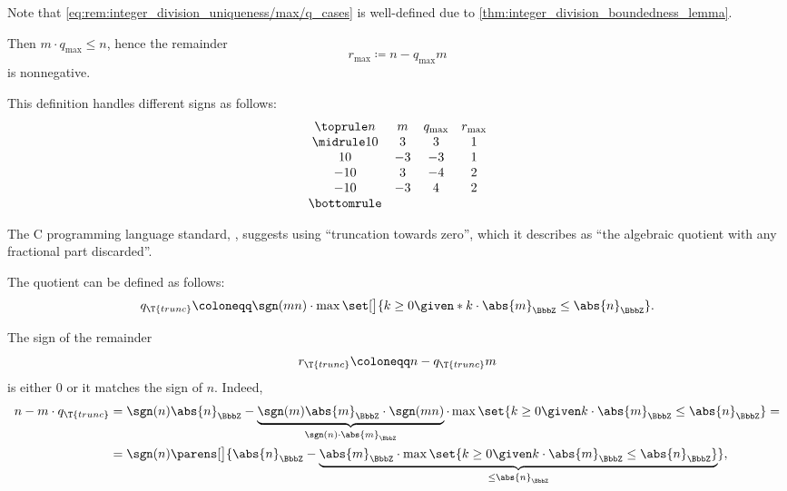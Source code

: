 \begin{remark}
\begin{thmenum}
    Note that \eqref{eq:rem:integer_division_uniqueness/max/q_cases} is well-defined due to \cref{thm:integer_division_boundedness_lemma}.

    Then \( m \cdot q_{\max} \leq n \), hence the remainder
    \begin{equation*}
      r_{\max} \coloneqq n - q_{\max} m
    \end{equation*}
    is nonnegative.

    This definition handles different signs as follows:
    \begin{equation*}
      \begin{array}{*{4}{c}}
        \toprule
        n   & m  & q_{\max} & r_{\max} \\
        \midrule
        10  & 3  & 3        & 1        \\
        10  & -3 & -3       & 1        \\
        -10 & 3  & -4       & 2        \\
        -10 & -3 & 4        & 2        \\
        \bottomrule
      \end{array}
    \end{equation*}

     The C programming language standard, \cite[66]{ISO:9899:2018}, suggests using \enquote{truncation towards zero}, which it describes as \enquote{the algebraic quotient with any fractional part discarded}.

    The quotient can be defined as follows:
    \begin{equation}\label{eq:rem:integer_division_uniqueness/trunc/q}
      q_{\T{trunc}} \coloneqq \sgn(mn) \cdot \max\set[\big]{ k \geq 0 \given* k \cdot \abs{m}_\BbbZ \leq \abs{n}_\BbbZ }.
    \end{equation}

    The sign of the remainder
    \begin{equation*}
      r_{\T{trunc}} \coloneqq n - q_{\T{trunc}} m
    \end{equation*}
    is either \( 0 \) or it matches the sign of \( n \). Indeed,
    \begin{align*}
      n - m \cdot q_{\T{trunc}}
      &=
      \sgn(n) \abs{n}_\BbbZ - \underbrace{\sgn(m) \abs{m}_\BbbZ \cdot \sgn(mn)}_{\sgn(n) \cdot \abs{m}_\BbbZ} \cdot \max\set{ k \geq 0 \given k \cdot \abs{m}_\BbbZ \leq \abs{n}_\BbbZ }
      = \\ &=
      \sgn(n) \parens[\big]{ \abs{n}_\BbbZ - \underbrace{\abs{m}_\BbbZ \cdot \max\set{ k \geq 0 \given k \cdot \abs{m}_\BbbZ \leq \abs{n}_\BbbZ }}_{\leq \abs{n}_\BbbZ} },
    \end{align*}


\end{thmenum}
\end{remark}
